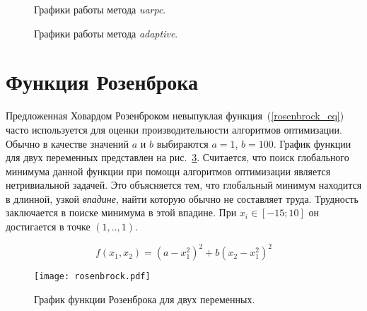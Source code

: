 \begin{figure}
  \centering
  \caption{ Графики работы метода \textit{uarpc}.}
  \label{uarpc_sphere_plot}
\end{figure}

\begin{figure}
  \centering
  \caption{ Графики работы метода \textit{adaptive}.}
  \label{adaptive_sphere_plot}
\end{figure}

\section{Функция Розенброка}

Предложенная Ховардом Розенброком невыпуклая функция~(\ref{rosenbrock_eq}) часто используется для оценки производительности алгоритмов оптимизации. Обычно в качестве значений $a$ и $b$ выбираются $a = 1$, $b = 100$. График функции для двух переменных представлен на рис.~\ref{rosenbrock_plot}. Считается, что поиск глобального минимума данной функции при помощи алгоритмов оптимизации является нетривиальной задачей. Это объясняется тем, что глобальный минимум находится в длинной, узкой \textit{впадине}, найти которую обычно не составляет труда. Трудность заключается в поиске минимума в этой впадине. При $x_i \in [-15; 10]$ он достигается в точке $(1,..,1)$.

\begin{equation}
\label{rosenbrock_eq}
f(x_1, x_2) = (a - x_1^2)^2 + b(x_2 - x_1^2)^2
\end{equation}


\begin{figure}
    \centering
    \texttt{[image: rosenbrock.pdf]}
    \caption{График функции Розенброка для двух переменных.}
    \label{rosenbrock_plot}
\end{figure}

